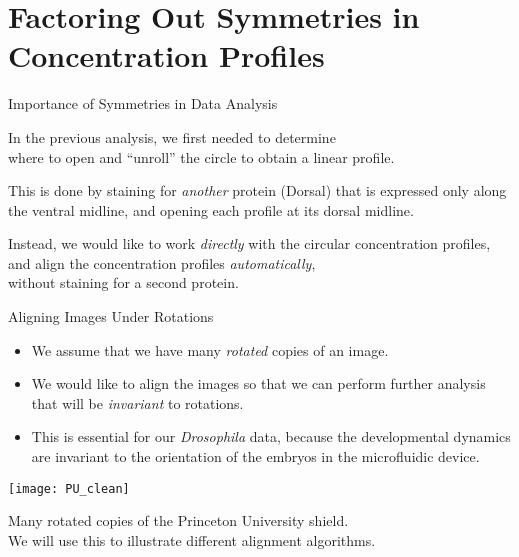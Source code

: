 \section[Factoring Out Symmetries in Concentration Profiles]{Factoring Out Symmetries in Concentration Profiles}

\begin{frame}{Importance of Symmetries in Data Analysis}

	\centering
	In the previous analysis, we first needed to determine \\where to open and ``unroll'' the circle to obtain a linear profile.
	
	\centering
	
	This is done by staining for {\em another} protein (Dorsal) that is expressed only along the ventral midline, and opening each profile at its dorsal midline. 
	
	\vspace{0.2in}
	
	Instead, we would like to work {\em directly} with the circular concentration profiles, \\ and align the concentration profiles {\em automatically}, \\without staining for a second protein. 

\end{frame}

\begin{frame}{Aligning Images Under Rotations}
	
	\begin{itemize}
	\item We assume that we have many {\em rotated} copies of an image.
	\item We would like to align the images so that we can perform further analysis that will be {\em invariant} to rotations. 
	\item This is essential for our {\em Drosophila} data, because the developmental dynamics are invariant to the orientation of the embryos in the microfluidic device.
	\end{itemize}

	\centering
	\texttt{[image: PU\_clean]}\\
	{\scriptsize Many rotated copies of the Princeton University shield. \\ We will use this to illustrate different alignment algorithms. \par}	

\end{frame}

